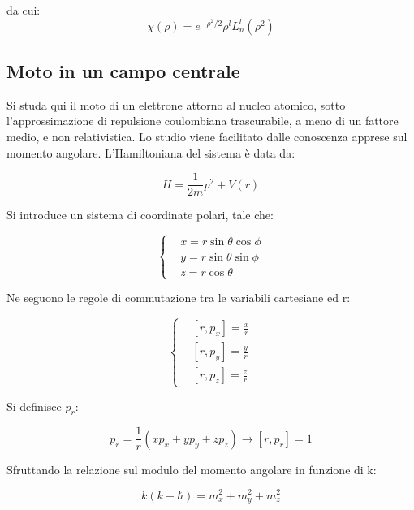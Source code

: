 \documentclass{report}
\begin{document}
da cui:
\begin{equation}
  \chi(\rho)=e^{-\rho^2/2} \rho^l L_n^l(\rho^2)
\end{equation}




\subsection{Moto in un campo centrale}
Si studa qui il moto di un elettrone attorno al nucleo atomico, sotto l'approssimazione di repulsione coulombiana trascurabile, a meno di un fattore medio, e non relativistica.
Lo studio viene facilitato dalle conoscenza apprese sul momento angolare.
L'Hamiltoniana del sistema è data da:

\begin{equation}
  H=\frac{1}{2m}p^2+V(r)
\end{equation}

Si introduce un sistema di coordinate polari, tale che:

\begin{equation}
  \left\{
  \begin{aligned}
     & x=r\sin{\theta}\cos{\phi} \\
     & y=r\sin{\theta}\sin{\phi} \\
     & z=r\cos{\theta}
  \end{aligned}
  \right.
\end{equation}

Ne seguono le regole di commutazione tra le variabili cartesiane ed r:

\begin{equation}
  \left\{
  \begin{aligned}
     & [r, p_x]=\frac{x}{r} \\
     & [r, p_y]=\frac{y}{r} \\
     & [r, p_z]=\frac{z}{r}
  \end{aligned}
  \right.
\end{equation}

Si definisce $p_r$:

\begin{equation}
  p_r=\frac{1}{r}(xp_x+yp_y+zp_z) \rightarrow [r, p_r]=1
\end{equation}

Sfruttando la relazione sul modulo del momento angolare in funzione di k:

\begin{equation}
  k(k+\hbar)=m_x^2+m_y^2+m_z^2
\end{equation}
\end{document}
